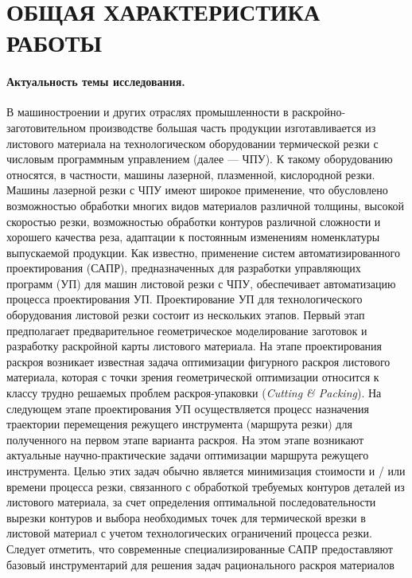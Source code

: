 \documentclass[14pt]{extarticle}
\begin{document}
\section*{ОБЩАЯ ХАРАКТЕРИСТИКА РАБОТЫ}

\paragraph*{Актуальность темы исследования.}
В машиностроении и других отраслях промышленности в раскройно-заготовительном производстве 
большая часть продукции изготавливается из листового материала на технологическом оборудовании термической резки 
с числовым программным управлением 
(далее --- ЧПУ). 
К такому оборудованию относятся, в частности, 
машины лазерной, плазменной, кислородной резки. 
Машины лазерной резки с ЧПУ имеют широкое применение, 
что обусловлено возможностью обработки многих видов материалов различной толщины, 
высокой скоростью резки, возможностью обработки контуров различной сложности и хорошего качества реза, 
адаптации к постоянным изменениям номенклатуры выпускаемой продукции. 
Как известно, применение систем автоматизированного проектирования (САПР), 
предназначенных для разработки управляющих программ (УП) 
для машин листовой резки с ЧПУ, обеспечивает автоматизацию процесса проектирования УП. 
Проектирование УП для технологического оборудования листовой резки 
состоит из нескольких этапов. 
Первый этап предполагает предварительное геометрическое моделирование заготовок 
и разработку раскройной карты листового материала. 
На этапе проектирования раскроя возникает известная задача оптимизации фигурного раскроя листового материала, 
которая с точки зрения геометрической оптимизации
относится к классу трудно решаемых проблем раскроя-упаковки 
({\it Cutting \& Packing}). 
На следующем этапе проектирования УП осуществляется процесс назначения траектории 
перемещения режущего инструмента 
(маршрута резки) 
для полученного на первом этапе варианта раскроя. 
На этом этапе возникают актуальные научно-практические задачи 
оптимизации маршрута режущего инструмента. 
Целью этих задач обычно является минимизация стоимости и / или времени процесса резки, 
связанного с обработкой требуемых контуров деталей из листового материала, 
за счет определения оптимальной последовательности вырезки контуров 
и выбора необходимых точек для термической врезки в листовой материал 
с учетом технологических ограничений процесса резки. 
Следует отметить, что современные специализированные САПР предоставляют 
базовый инструментарий для решения задач рационального раскроя материалов 
\end{document}
